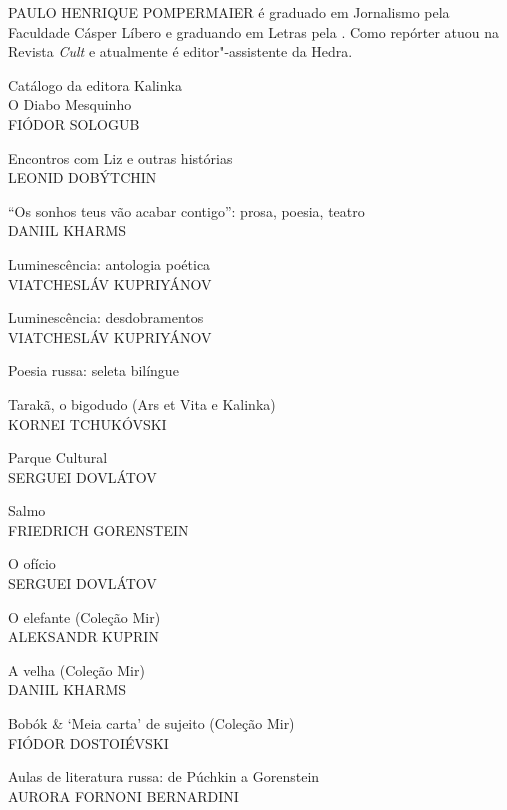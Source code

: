 \medskip

\noindent{}PAULO HENRIQUE POMPERMAIER é graduado em Jornalismo pela Faculdade Cásper Líbero e graduando em Letras pela \scalebox{0.8}{USP}. Como repórter atuou na Revista \emph{Cult} e atualmente é editor"-assistente da Hedra.

\afterpage{\blankpage}

\newpage
\pagestyle{empty}
\MyriadPro

\noindent{}Catálogo da editora Kalinka\\[5pt]

\noindent{}O Diabo Mesquinho\\
FIÓDOR SOLOGUB
\medskip

\noindent{}Encontros com Liz e outras histórias\\
LEONID DOBÝTCHIN
\medskip

\noindent{}``Os sonhos teus vão acabar contigo'': prosa, poesia, teatro\\
DANIIL KHARMS
\medskip

\noindent{}Luminescência: antologia poética\\
VIATCHESLÁV KUPRIYÁNOV
\medskip

\noindent{}Luminescência: desdobramentos\\
VIATCHESLÁV KUPRIYÁNOV
\medskip

\noindent{}Poesia russa: seleta bilíngue
\medskip

\noindent{}Tarakã, o bigodudo (Ars et Vita e Kalinka)\\
KORNEI TCHUKÓVSKI
\medskip

\noindent{}Parque Cultural\\
SERGUEI DOVLÁTOV
\medskip

\noindent{}Salmo\\
FRIEDRICH GORENSTEIN
\medskip

\noindent{}O ofício\\
SERGUEI DOVLÁTOV
\medskip

\noindent{}O elefante (Coleção Mir)\\
ALEKSANDR KUPRIN
\medskip

\noindent{}A velha (Coleção Mir)\\
DANIIL KHARMS 
\medskip

\noindent{}Bobók \& `Meia carta' de sujeito (Coleção Mir)\\
FIÓDOR DOSTOIÉVSKI
\medskip

\noindent{}Aulas de literatura russa: de Púchkin a Gorenstein \\
AURORA FORNONI BERNARDINI
\medskip

